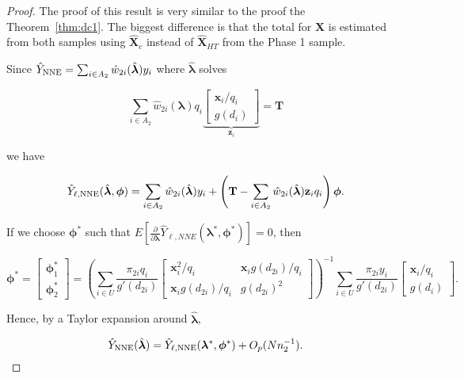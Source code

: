 \documentclass[12pt]{article}
\renewcommand{\bf}[1]{\mathbf{#1}}
\begin{document}
\begin{proof}
  The proof of this result is very similar to the proof the
  Theorem~\ref{thm:dc1}. The biggest difference is that the total for $\bf X$ is
  estimated from both samples using $\hat{\bf X}_c$ instead of 
  $\hat{\bf X}_{HT}$ from the Phase 1 sample.

  Since $\hat Y_{\rm NNE} = \sum_{i \in A_2} \hat w_{2i}(\hat{\bm \lambda})y_i$ where
  $\hat{\bm \lambda}$ solves

  \begin{equation}
    \sum_{i \in A_2} \hat w_{2i}(\bm \lambda) q_i
    \underbrace{
    \begin{bmatrix} 
      \bf x_i / q_i \\ g(d_i)
  \end{bmatrix}}_{\bf z_i} = \bf T
  \end{equation}

  we have 

  $$\hat Y_{\ell, \rm NNE} (\hat{\bm \lambda}, \bm \phi) = \sum_{i \in A_2} \hat
  w_{2i}(\hat{\bm \lambda})y_i + \left(\bf T - \sum_{i \in A_2} \hat
  w_{2i}(\hat{\bm \lambda}) \bf z_i q_i\right) \bm \phi.$$

  If we choose $\bm \phi^*$ such that $E\left[\frac{\partial}{\partial \bm \lambda} 
    \hat Y_{\ell, NNE}(\bm \lambda^*, \bm \phi^*)\right] = 0$, then

  $$\bm \phi^* =
  \begin{bmatrix}
    \bm \phi^*_1 \\ \bm \phi^*_2
  \end{bmatrix} = 
  \left(\sum_{i \in U} \frac{\pi_{2i} q_i}{g'(d_{2i})} 
  \begin{bmatrix}
    \bf x_i^2 / q_i & \bf x_i g(d_{2i}) / q_i \\
    \bf x_i g(d_{2i}) / q_i & g(d_{2i})^2
  \end{bmatrix}
  \right)^{-1}
  \sum_{i \in U} \frac{\pi_{2i} y_i}{g'(d_{2i})} 
  \begin{bmatrix} \bf x_i / q_i \\ g(d_i) \end{bmatrix}.
  $$

  Hence, by a Taylor expansion around $\hat{\bm \lambda}$,
  
  $$\hat Y_{\rm NNE}(\hat{\bm \lambda}) = \hat Y_{\ell, \rm NNE}(\bm \lambda^*, 
  \bm \phi^*) + O_p(Nn_2^{-1}).$$

\end{proof}
\end{document}
